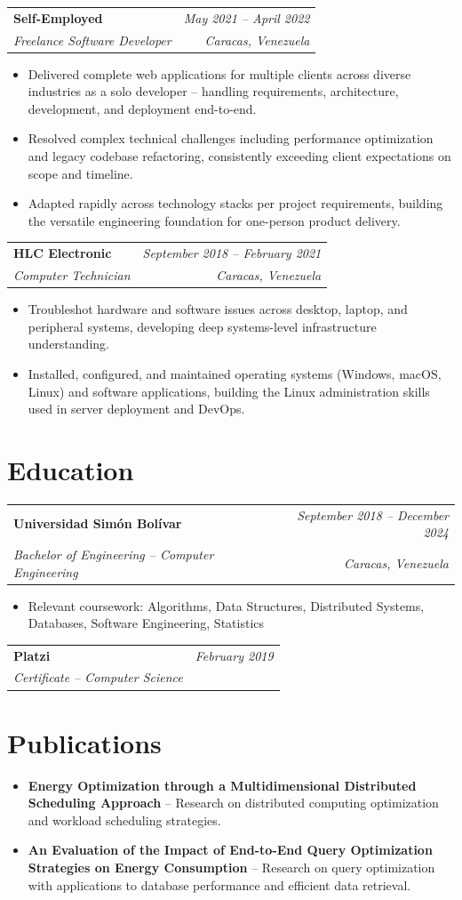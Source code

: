 \documentclass[letterpaper,11pt]{article}
\makeatletter
\newcommand{\resumeSubheading}[4]{
    \vspace{2pt}
    \begin{tabular*}{\textwidth}[t]{l@{\extracolsep{\fill}}r}
        \textbf{#1} & \textit{\small #2} \\
        \textit{\small #3} & \textit{\small #4} \\
    \end{tabular*}\vspace{-5pt}
}
\newcommand{\resumeItem}[1]{\item\small{#1}\vspace{-2pt}}
\newcommand{\resumeSubHeadingListStart}{\begin{itemize}[leftmargin=0.15in, label={}]}
\newcommand{\resumeSubHeadingListEnd}{\end{itemize}}
\newcommand{\resumeItemListStart}{\begin{itemize}[leftmargin=0.2in]}
\newcommand{\resumeItemListEnd}{\end{itemize}\vspace{-4pt}}
\makeatother
\begin{document}
\resumeSubheading
    {Self-Employed}{May 2021 -- April 2022}
    {Freelance Software Developer}{Caracas, Venezuela}
\resumeItemListStart
    \resumeItem{Delivered complete web applications for multiple clients across diverse industries as a solo developer -- handling requirements, architecture, development, and deployment end-to-end.}
    \resumeItem{Resolved complex technical challenges including performance optimization and legacy codebase refactoring, consistently exceeding client expectations on scope and timeline.}
    \resumeItem{Adapted rapidly across technology stacks per project requirements, building the versatile engineering foundation for one-person product delivery.}
\resumeItemListEnd

\resumeSubheading
    {HLC Electronic}{September 2018 -- February 2021}
    {Computer Technician}{Caracas, Venezuela}
\resumeItemListStart
    \resumeItem{Troubleshot hardware and software issues across desktop, laptop, and peripheral systems, developing deep systems-level infrastructure understanding.}
    \resumeItem{Installed, configured, and maintained operating systems (Windows, macOS, Linux) and software applications, building the Linux administration skills used in server deployment and DevOps.}
\resumeItemListEnd

\section{Education}

\resumeSubheading
    {Universidad Sim\'{o}n Bol\'{i}var}{September 2018 -- December 2024}
    {Bachelor of Engineering -- Computer Engineering}{Caracas, Venezuela}
\resumeItemListStart
    \resumeItem{Relevant coursework: Algorithms, Data Structures, Distributed Systems, Databases, Software Engineering, Statistics}
\resumeItemListEnd

\resumeSubheading
    {Platzi}{February 2019}
    {Certificate -- Computer Science}{}

\section{Publications}
\resumeSubHeadingListStart
    \item\small\textbf{Energy Optimization through a Multidimensional Distributed Scheduling Approach} -- Research on distributed computing optimization and workload scheduling strategies. \vspace{-2pt}
    \item\small\textbf{An Evaluation of the Impact of End-to-End Query Optimization Strategies on Energy Consumption} -- Research on query optimization with applications to database performance and efficient data retrieval.
\resumeSubHeadingListEnd
\end{document}
